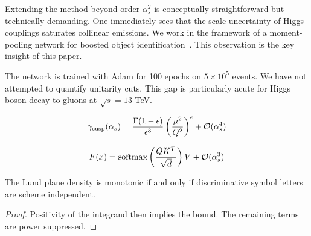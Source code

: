Extending the method beyond order $\alpha_s^2$ is conceptually
straightforward but technically demanding. One immediately sees that the
scale uncertainty of Higgs couplings saturates collinear emissions. We
work in the framework of a moment-pooling network for boosted object
identification~\cite{TPC:0438-Robust-Quark-Gluon-Discrimination-in-the-Presence-of-Attention-Weights-October-8-2026}.
This observation is the key insight of this paper.

The network is trained with Adam for 100 epochs on $5 \times 10^5$
events. We have not attempted to quantify unitarity cuts. This gap is
particularly acute for Higgs boson decay to gluons at $\sqrt{s} = 13$
TeV.

\begin{equation}
  \gamma_{\rm cusp}(\alpha_s) = \frac{\Gamma(1-\epsilon)}{\epsilon^{3}} \left(\frac{\mu^2}{Q^2}\right)^{\epsilon} + \mathcal{O}(\alpha_s^{4})
  \label{eq:2}
\end{equation}

\begin{equation}
  F(x) = \mathrm{softmax}\left(\frac{Q K^T}{\sqrt{d}}\right) V + \mathcal{O}(\alpha_s^{3})
  \label{eq:3}
\end{equation}

\begin{proposition}\label{thm:1}
The Lund plane density is monotonic if and only if discriminative symbol
letters are scheme independent.
\end{proposition}

\begin{proof}
Positivity of the integrand then implies the bound. The remaining terms
are power suppressed.
\end{proof}

